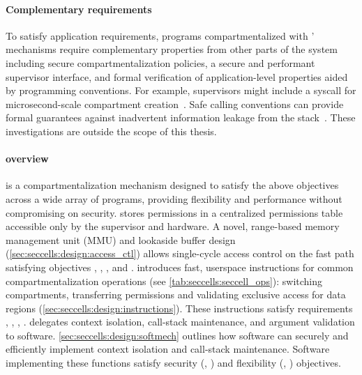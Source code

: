 \paragraph{Complementary requirements}
To satisfy application requirements,
programs compartmentalized with \seccells' mechanisms require
complementary properties from other parts of the system
including secure compartmentalization policies, 
a secure and performant supervisor interface, 
and formal verification of application-level properties
aided by programming conventions.
For example, supervisors might include a syscall for 
microsecond-scale compartment creation~\cite{LittonVE0BD16}.
Safe calling conventions can provide formal guarantees against
inadvertent information leakage from the stack~\cite{SkorstengaardDB20}.
These investigations are outside the scope of this thesis.

\paragraph{\seccells overview}
\seccells is a compartmentalization mechanism designed
to satisfy the above objectives across a wide array of 
programs, providing flexibility and performance without compromising on 
security.
\seccells stores permissions in a centralized permissions table accessible 
only by the supervisor and hardware.
A novel, range-based memory management unit (MMU) and 
lookaside buffer design (\autoref{sec:seccells:design:access_ctl})
allows single-cycle access control on the fast path satisfying 
objectives , , , and .
\seccells introduces fast, userspace instructions for common 
compartmentalization operations (see \autoref{tab:seccells:seccell_ops}): 
switching compartments, transferring permissions and validating
exclusive access for data regions (\autoref{sec:seccells:design:instructions}).
These instructions satisfy requirements , ,
, .
\seccells delegates context isolation, call-stack maintenance,
and argument validation to software.
\autoref{sec:seccells:design:softmech} outlines how software can
securely and efficiently implement context isolation and call-stack 
maintenance.
Software implementing these functions satisfy security (, )
and flexibility (, ) objectives.

\section{\seccells}
\label{sec:seccells:design}

